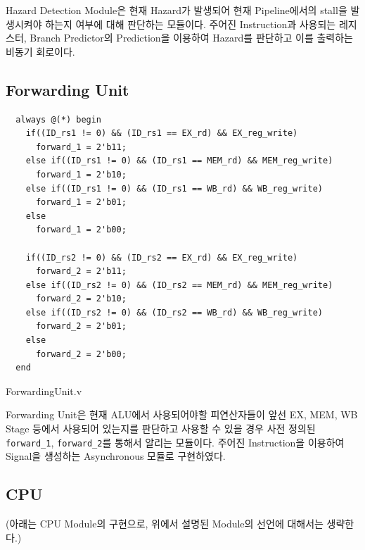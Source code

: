 \documentclass[openright, a4paper]{article}
\newcommand{\code}[1]{\texttt{#1}}
\newenvironment{longlisting}{\captionsetup{type=listing}}{}
\begin{document}
Hazard Detection Module은 현재 Hazard가 발생되어 현재 Pipeline에서의 stall을 발생시켜야 하는지 여부에 대해 판단하는 모듈이다.
주어진 Instruction과 사용되는 레지스터, Branch Predictor의 Prediction을 이용하여 Hazard를 판단하고 이를 출력하는 비동기 회로이다. \\

\subsection{Forwarding Unit}

\begin{longlisting}
    \begin{verbatim}
  always @(*) begin
    if((ID_rs1 != 0) && (ID_rs1 == EX_rd) && EX_reg_write)
      forward_1 = 2'b11;
    else if((ID_rs1 != 0) && (ID_rs1 == MEM_rd) && MEM_reg_write)
      forward_1 = 2'b10;
    else if((ID_rs1 != 0) && (ID_rs1 == WB_rd) && WB_reg_write)
      forward_1 = 2'b01;
    else
      forward_1 = 2'b00;

    if((ID_rs2 != 0) && (ID_rs2 == EX_rd) && EX_reg_write)
      forward_2 = 2'b11;
    else if((ID_rs2 != 0) && (ID_rs2 == MEM_rd) && MEM_reg_write)
      forward_2 = 2'b10;
    else if((ID_rs2 != 0) && (ID_rs2 == WB_rd) && WB_reg_write)
      forward_2 = 2'b01;
    else
      forward_2 = 2'b00;
  end
    \end{verbatim}
    \caption{ForwardingUnit.v}
\end{longlisting}

Forwarding Unit은 현재 ALU에서 사용되어야할 피연산자들이 앞선 EX, MEM, WB Stage 등에서 사용되어 있는지를 판단하고 사용할 수 있을 경우 사전 정의된 \code{forward_1}, \code{forward_2}를 통해서 알리는 모듈이다.
주어진 Instruction을 이용하여 Signal을 생성하는 Asynchronous 모듈로 구현하였다. \\

\subsection{CPU}

(아래는 CPU Module의 구현으로, 위에서 설명된 Module의 선언에 대해서는 생략한다.)
\end{document}
